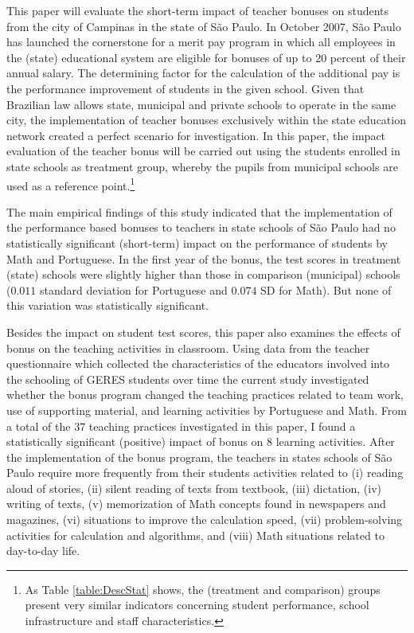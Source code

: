 \documentclass[a4paper, 12pt]{article}
\begin{document}
This paper will evaluate the short-term impact of teacher bonuses on students from the city of Campinas in the state of São Paulo. In October 2007, São Paulo has launched the cornerstone for a merit pay program in which all employees in the (state) educational system are eligible for bonuses of up to 20 percent of their annual salary. The determining factor for the calculation of the additional pay is the performance improvement of students in the given school. Given that Brazilian law allows state, municipal and private schools to operate in the same city, the implementation of teacher bonuses exclusively within the state education network created a perfect scenario for investigation. In this paper, the impact evaluation of the teacher bonus will be carried out using the students enrolled in state schools as treatment group, whereby the pupils from municipal schools are used as a reference point.\footnote{As Table \ref{table:DescStat} shows, the (treatment and comparison) groups present very similar indicators concerning student performance, school infrastructure and staff characteristics.}


The main empirical findings of this study indicated that the implementation of the performance based bonuses to teachers in state schools of São Paulo had no statistically significant (short-term) impact on the performance of students by Math and Portuguese. In the first year of the bonus, the test scores in treatment (state) schools were slightly higher than those in comparison (municipal) schools ($0.011$ standard deviation for Portuguese and $0.074$ SD for Math). But none of this variation was statistically significant. 



Besides the impact on student test scores, this paper also examines the effects of bonus on the teaching activities in classroom. Using data from the teacher questionnaire \textemdash which collected the characteristics of the educators involved into the schooling of GERES students over time \textemdash the current study investigated whether the bonus program changed the teaching practices related to team work, use of supporting material, and learning activities by Portuguese and Math. From a total of the 37 teaching practices investigated in this paper, I found a statistically significant (positive) impact of bonus on 8 learning activities. After the implementation of the bonus program, the teachers in states schools of São Paulo require more frequently from their students activities related to (i) reading aloud of stories, (ii) silent reading of texts from textbook, (iii) dictation, (iv) writing of texts, (v) memorization of Math concepts found in newspapers and magazines, (vi) situations to improve the calculation speed, (vii) problem-solving activities for calculation and algorithms, and (viii) Math situations related to day-to-day life.
\end{document}
